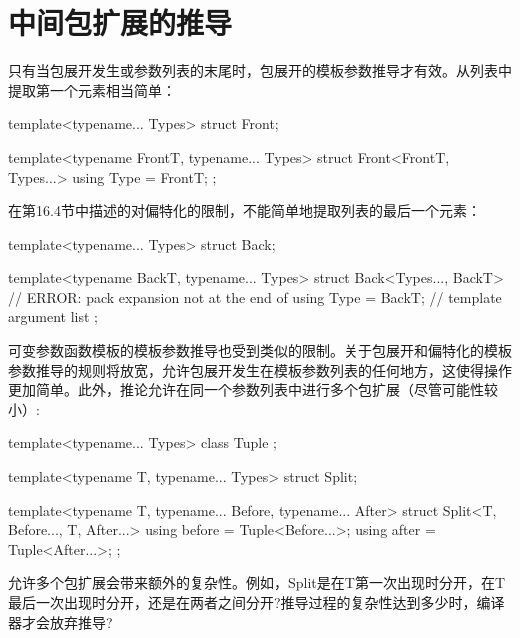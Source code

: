 \section{中间包扩展的推导}
只有当包展开发生或参数列表的末尾时，包展开的模板参数推导才有效。从列表中提取第一个元素相当简单：

\begin{cpp}
template<typename... Types>
struct Front;

template<typename FrontT, typename... Types>
struct Front<FrontT, Types...> {
	using Type = FrontT;
};
\end{cpp}

在第16.4节中描述的对偏特化的限制，不能简单地提取列表的最后一个元素：

\begin{cpp}
template<typename... Types>
struct Back;

template<typename BackT, typename... Types>
struct Back<Types..., BackT> { // ERROR: pack expansion not at the end of
	using Type = BackT; // template argument list
};
\end{cpp}

可变参数函数模板的模板参数推导也受到类似的限制。关于包展开和偏特化的模板参数推导的规则将放宽，允许包展开发生在模板参数列表的任何地方，这使得操作更加简单。此外，推论允许在同一个参数列表中进行多个包扩展（尽管可能性较小）:

\begin{cpp}
template<typename... Types> class Tuple {
};

template<typename T, typename... Types>
struct Split;

template<typename T, typename... Before, typename... After>
struct Split<T, Before..., T, After...> {
	using before = Tuple<Before...>;
	using after = Tuple<After...>;
};
\end{cpp}

允许多个包扩展会带来额外的复杂性。例如，Split是在T第一次出现时分开，在T最后一次出现时分开，还是在两者之间分开?推导过程的复杂性达到多少时，编译器才会放弃推导?













































